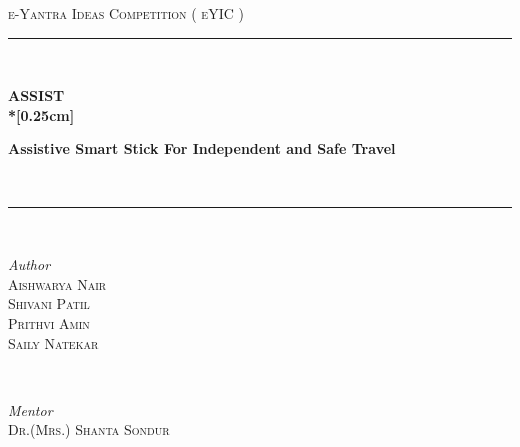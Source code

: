 \documentclass{article}
\begin{document}
\begin{titlepage} %
	\newcommand{\HRule}{\rule{\linewidth}{0.5mm}} %
	\center %
	
	
	\textsc{\LARGE e-Yantra Ideas Competition ( eYIC )}\\[1.5cm] %
	
	
	
	\HRule\\[0.4cm]
	\vfill
	{{\Huge\textbf{ASSIST\\*[0.25cm]}}   

    \par\vspace {0.5cm}
    
    {\Large\textbf{Assistive Smart Stick For Independent and Safe Travel}}    }\\[1cm] %
	
	\HRule\\[1.5cm]
	
	
	\begin{minipage}[t]{0.4\textwidth}
		\begin{flushleft}
			\large
			\textit{Author}\\
			\textsc{Aishwarya Nair}\\
			\textsc{Shivani Patil}\\
			\textsc{Prithvi Amin}\\
			\textsc{Saily Natekar}\\
		\end{flushleft}
	\end{minipage}
	~
	\begin{minipage}[t]{0.4\textwidth}
		\begin{flushright}
			\large
			\textit{Mentor}\\
			\textsc{Dr.(Mrs.) Shanta Sondur}\\ %
		\end{flushright}
	\end{minipage}


\end{titlepage}
\end{document}
